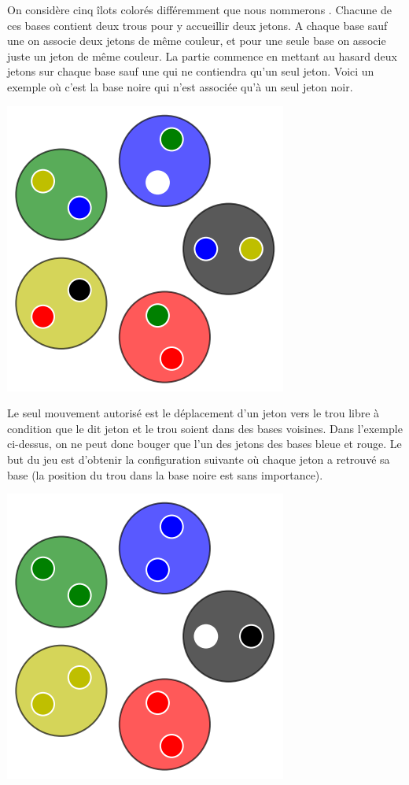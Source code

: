 On considère cinq îlots colorés différemment que nous nommerons . Chacune de ces bases contient deux trous pour y accueillir deux jetons. A chaque base sauf une on associe deux jetons de même couleur, et pour une seule base on associe juste un jeton de même couleur. La partie commence en mettant au hasard deux jetons sur chaque base sauf une qui ne contiendra qu'un seul jeton. Voici un exemple où c'est la base noire qui n'est associée qu'à un seul jeton noir.

\begin{center}   %
	\includegraphics[scale= 0.3]{content/rules/start.png}
\end{center}

Le seul mouvement autorisé est le déplacement d'un jeton vers le trou libre à condition que le dit jeton et le trou soient dans des bases voisines. Dans l'exemple ci-dessus, on ne peut donc bouger que l'un des jetons des bases bleue et rouge. Le but du jeu est d'obtenir la configuration suivante où chaque jeton a retrouvé sa base (la position du trou dans la base noire est sans importance).

\begin{center}
	\includegraphics[scale= 0.3]{content/rules/end.png}
\end{center}

